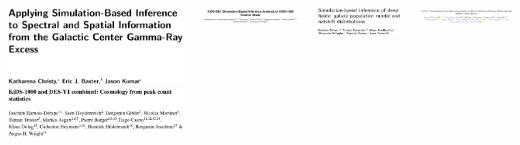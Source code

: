 \documentclass[aspectratio=169]{beamer}
\begin{document}
\begin{frame}
\begin{columns}
        \includegraphics[width=\textwidth]{figures/sbi_papers/center.pdf}
        \includegraphics[width=\textwidth]{figures/sbi_papers/kidsdes.pdf}
        \vspace{10pt}

        \includegraphics[width=\textwidth]{figures/sbi_papers/kids.pdf}
        \vspace{10pt}

        \includegraphics[width=\textwidth]{figures/sbi_papers/population.pdf}
        \vspace{10pt}

        \includegraphics[width=\textwidth]{figures/sbi_papers/simbig.pdf}
    \end{columns}
    
\end{frame}
\end{document}
